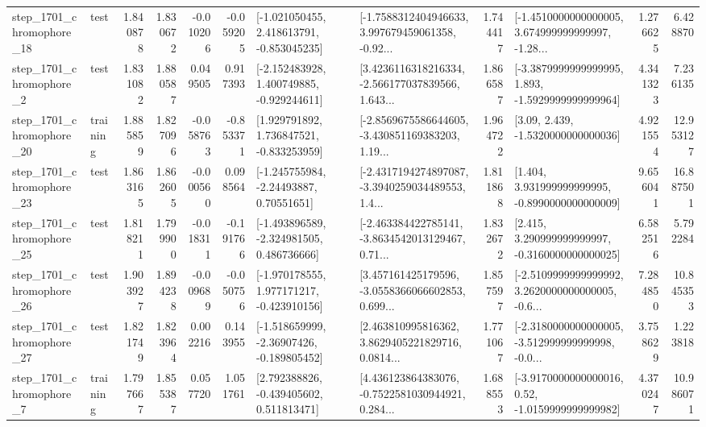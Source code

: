 \begin{tabular}{llrrrrllrlrr}
 step\_1701\_chromophore\_18 &      test &      1.840878 &    1.830672 &     -0.010206 & -0.059205 &   [-1.021050455, 2.418613791, -0.853045235] &  [-1.7588312404946633, 3.997679459061358, -0.92... &       1.744417 &  [-1.4510000000000005, 3.674999999999997, -1.28... &            1.276625 &          6.428870 \\
  step\_1701\_chromophore\_2 &      test &      1.831082 &    1.880587 &      0.049505 &  0.917393 &   [-2.152483928, 1.400749885, -0.929244611] &  [3.4236116318216334, -2.566177037839566, 1.643... &       1.866587 &  [-3.3879999999999995, 1.893, -1.5929999999999964] &            4.341323 &          7.236135 \\
 step\_1701\_chromophore\_20 &  training &      1.885859 &    1.827096 &     -0.058763 & -0.853371 &    [1.929791892, 1.736847521, -0.833253959] &  [-2.8569675586644605, -3.430851169383203, 1.19... &       1.964722 &                 [3.09, 2.439, -1.5320000000000036] &            4.921554 &         12.953127 \\
 step\_1701\_chromophore\_23 &      test &      1.863165 &    1.862605 &     -0.000560 &  0.098564 &     [-1.245755984, -2.24493887, 0.70551651] &  [-2.4317194274897087, -3.3940259034489553, 1.4... &       1.811868 &    [1.404, 3.931999999999995, -0.8990000000000009] &            9.656041 &         16.887501 \\
 step\_1701\_chromophore\_25 &      test &      1.818211 &    1.799900 &     -0.018311 & -0.191766 &   [-1.493896589, -2.324981505, 0.486736666] &  [-2.463384422785141, -3.8634542013129467, 0.71... &       1.832672 &    [2.415, 3.290999999999997, -0.3160000000000025] &            6.582516 &          5.792284 \\
 step\_1701\_chromophore\_26 &      test &      1.903927 &    1.894238 &     -0.009689 & -0.050756 &   [-1.970178555, 1.977171217, -0.423910156] &  [3.457161425179596, -3.0558366066602853, 0.699... &       1.857597 &  [-2.5109999999999992, 3.2620000000000005, -0.6... &            7.284850 &         10.845353 \\
 step\_1701\_chromophore\_27 &      test &      1.821749 &    1.823964 &      0.002216 &  0.143955 &   [-1.518659999, -2.36907426, -0.189805452] &  [2.463810995816362, 3.8629405221829716, 0.0814... &       1.771067 &  [-2.3180000000000005, -3.512999999999998, -0.0... &            3.758629 &          1.223818 \\
  step\_1701\_chromophore\_7 &  training &      1.797667 &    1.855387 &      0.057720 &  1.051761 &    [2.792388826, -0.439405602, 0.511813471] &  [4.436123864383076, -0.7522581030944921, 0.284... &       1.688553 &   [-3.9170000000000016, 0.52, -1.0159999999999982] &            4.370247 &         10.986071 \\

\end{tabular}

